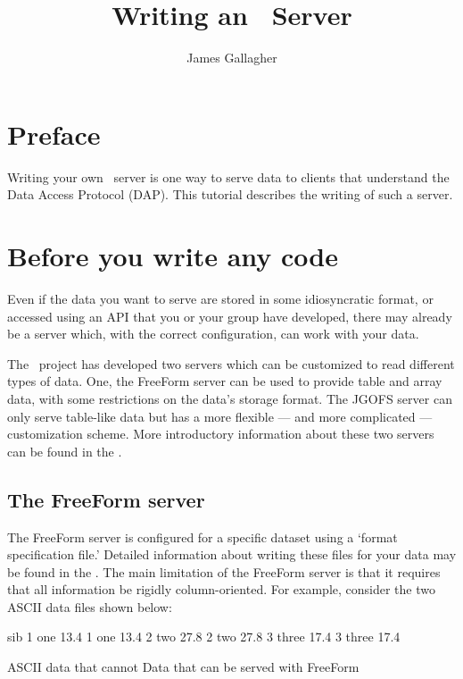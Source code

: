 \documentclass{dods-paper}
\title{Writing an \opendap\ Server}
\author{James Gallagher}
\begin{document}
\maketitle

\T\tableofcontents

\section{Preface}

Writing your own \opendap\ server is one way to serve data to clients
that understand the Data Access Protocol (DAP). This tutorial
describes the writing of such a server.


\section{Before you write any code}

Even if the data you want to serve are stored in some idiosyncratic
format, or accessed using an API that you or your group have
developed, there may already be a server which, with the correct
configuration, can work with your data.

The \opendap\ project has developed two servers which can be customized to
read different types of data.  One, the FreeForm server can be used to
provide table and array data, with some restrictions on the data's
storage format.  The JGOFS server can only serve table-like data but
has a more flexible --- and more complicated --- customization scheme.
More introductory information about these two servers can be found in
the .

  

\subsection{The FreeForm server}


The FreeForm server is configured for a specific dataset using a
`format specification file.' Detailed information about writing these
files for your data may be found in the .
The main limitation of the FreeForm server is that it requires that
all information be rigidly column-oriented. For example, consider the
two ASCII data files shown below:

\begin{vcode}{sib}
  1 one 13.4                            1 one   13.4
  2 two 27.8                            2 two   27.8
  3 three 17.4                          3 three 17.4

ASCII data that cannot                  Data that can
be served with FreeForm
\end{vcode}
\end{document}

